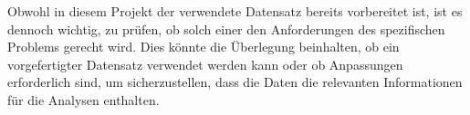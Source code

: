 Obwohl in diesem Projekt der verwendete Datensatz bereits vorbereitet ist, ist es dennoch wichtig, zu prüfen, ob solch einer den Anforderungen des spezifischen Problems gerecht wird.
Dies könnte die Überlegung beinhalten, ob ein vorgefertigter Datensatz verwendet werden kann oder ob Anpassungen erforderlich sind, um sicherzustellen, dass die Daten die relevanten Informationen für die Analysen enthalten.
    